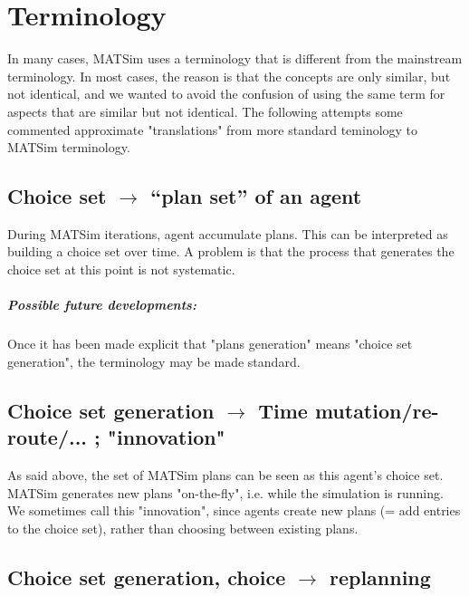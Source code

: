 \chapter{Terminology}
\label{sec:Terminology}


\bigskip

In  many cases, MATSim uses a terminology that is different from the  mainstream terminology. In most cases, the reason is that the  concepts are only similar, but not identical, and we wanted to avoid the  confusion of using the same term for aspects that are similar but not  identical. The following attempts some commented approximate  "translations" from more standard teminology to MATSim terminology.

\section{Choice set $\to$ ``plan set'' of an agent}

During MATSim iterations, agent accumulate   plans. This can be  interpreted as building a choice set over  time. A  problem is that the  process that generates the choice  set at this  point is not systematic.

\paragraph{Possible future developments:} Once it has been made explicit that "plans generation" means "choice set generation", the terminology may be made standard.

\section{Choice set generation $\to$ Time mutation/re-route/... ; "innovation"}

As said above, the set of MATSim plans can   be seen as this agent's choice set. MATSim generates new plans   "on-the-fly", i.e. while the simulation is running. We sometimes  call  this "innovation", since agents create new plans (= add entries to  the  choice set), rather than choosing between existing plans.

\section{Choice set generation, choice $\to$ replanning}

